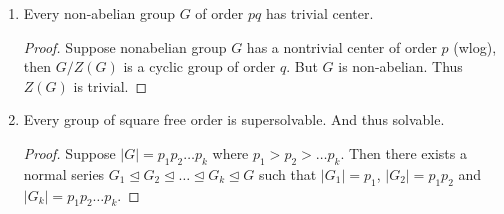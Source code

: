 \begin{enumerate}
	\item Every non-abelian group $G$ of order $pq$ has trivial center.
	\begin{proof}
		Suppose nonabelian group $G$ has a nontrivial center of order $p$ (wlog), then $G/Z(G)$ is a cyclic group of order $q$.
		But $G$ is non-abelian. Thus $Z(G)$ is trivial.
	\end{proof}
	\item Every group of square free order is supersolvable. And thus solvable.
		\begin{proof}
			Suppose $|G| = p_1 p_2 \dots p_k$ where $p_1 > p_2 > \dots p_k$. Then there exists a normal series $G_1 \trianglelefteq G_2 \trianglelefteq \dots \trianglelefteq G_k \trianglelefteq G$ such that $|G_1| = p_1$, $|G_2| = p_1p_2$ and $|G_k|=p_1p_2\dots p_k$.
		\end{proof}
\end{enumerate}	


